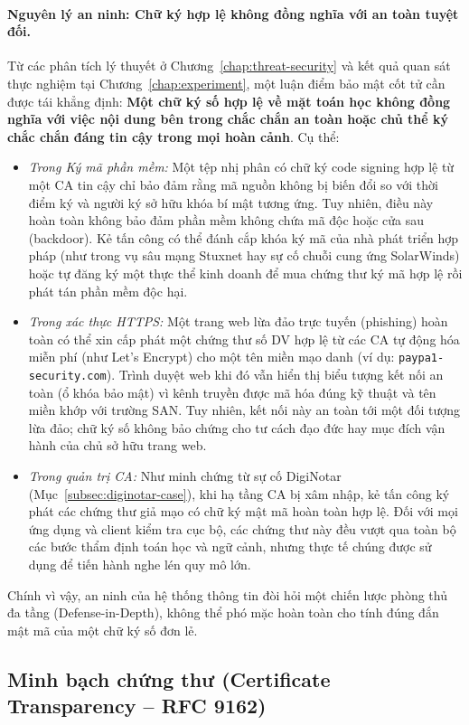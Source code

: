 \paragraph{Nguyên lý an ninh: Chữ ký hợp lệ không đồng nghĩa với an toàn tuyệt đối.}
Từ các phân tích lý thuyết ở Chương~\ref{chap:threat-security} và kết quả quan sát thực nghiệm tại Chương~\ref{chap:experiment}, một luận điểm bảo mật cốt tử cần được tái khẳng định: \textbf{Một chữ ký số hợp lệ về mặt toán học không đồng nghĩa với việc nội dung bên trong chắc chắn an toàn hoặc chủ thể ký chắc chắn đáng tin cậy trong mọi hoàn cảnh}. Cụ thể:
\begin{itemize}
    \item \textit{Trong Ký mã phần mềm:} Một tệp nhị phân có chữ ký code signing hợp lệ từ một CA tin cậy chỉ bảo đảm rằng mã nguồn không bị biến đổi so với thời điểm ký và người ký sở hữu khóa bí mật tương ứng. Tuy nhiên, điều này hoàn toàn không bảo đảm phần mềm không chứa mã độc hoặc cửa sau (backdoor). Kẻ tấn công có thể đánh cắp khóa ký mã của nhà phát triển hợp pháp (như trong vụ sâu mạng Stuxnet hay sự cố chuỗi cung ứng SolarWinds) hoặc tự đăng ký một thực thể kinh doanh để mua chứng thư ký mã hợp lệ rồi phát tán phần mềm độc hại.
    \item \textit{Trong xác thực HTTPS:} Một trang web lừa đảo trực tuyến (phishing) hoàn toàn có thể xin cấp phát một chứng thư số DV hợp lệ từ các CA tự động hóa miễn phí (như Let's Encrypt) cho một tên miền mạo danh (ví dụ: \texttt{paypa1-security.com}). Trình duyệt web khi đó vẫn hiển thị biểu tượng kết nối an toàn (ổ khóa bảo mật) vì kênh truyền được mã hóa đúng kỹ thuật và tên miền khớp với trường SAN. Tuy nhiên, kết nối này an toàn tới một đối tượng lừa đảo; chữ ký số không bảo chứng cho tư cách đạo đức hay mục đích vận hành của chủ sở hữu trang web.
    \item \textit{Trong quản trị CA:} Như minh chứng từ sự cố DigiNotar (Mục~\ref{subsec:diginotar-case}), khi hạ tầng CA bị xâm nhập, kẻ tấn công ký phát các chứng thư giả mạo có chữ ký mật mã hoàn toàn hợp lệ. Đối với mọi ứng dụng và client kiểm tra cục bộ, các chứng thư này đều vượt qua toàn bộ các bước thẩm định toán học và ngữ cảnh, nhưng thực tế chúng được sử dụng để tiến hành nghe lén quy mô lớn.
\end{itemize}
Chính vì vậy, an ninh của hệ thống thông tin đòi hỏi một chiến lược phòng thủ đa tầng (Defense-in-Depth), không thể phó mặc hoàn toàn cho tính đúng đắn mật mã của một chữ ký số đơn lẻ.

\subsection{Minh bạch chứng thư (Certificate Transparency -- RFC 9162)}
\label{subsec:ct-architecture-analysis}

